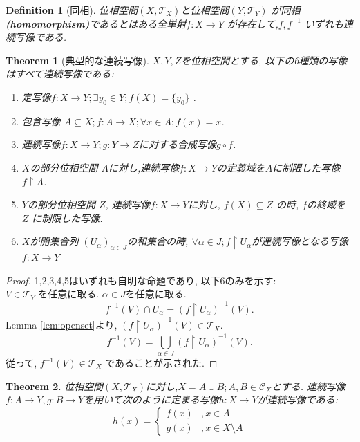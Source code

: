 \documentclass[dvipdfmx]{jbook}
\newtheorem{theorem}{Theorem}[section]
\newtheorem{definition}{Definition}[section]
\theoremstyle{remark}
\theoremstyle{plain}
\begin{document}
\begin{definition}[同相]
	位相空間$\left( X,\mathcal{T}_X \right) $と位相空間$\left( Y,\mathcal{T}_Y \right) $ が同相\textbf{(homomorphism)}であるとはある全単射$f:X\to Y$ が存在して,$f,f^{-1}$ いずれも連続写像である.  
\end{definition}










\begin{theorem}[典型的な連続写像]
	$X,Y,Z$を位相空間とする, 以下の6種類の写像はすべて連続写像である:
	 \begin{enumerate}
		\item 定写像$f: X \to Y; \exists y_0 \in Y ; f(X) =\{y_0\} $ .
		\item 包含写像 $A\subseteq X ; f: A \to X; \forall x \in A; f(x)=x$.
		\item 連続写像$f:X\to Y; g:Y\to Z$に対する合成写像$g\circ f$.
		\item $X$の部分位相空間 $A$に対し,連続写像$f:X\to Y$の定義域を$A$に制限した写像 $f\upharpoonright A$.
		\item  $Y$の部分位相空間 $Z$, 連続写像$f:X \to Y$に対し, $f\left( X \right) \subseteq Z$ の時, $f$の終域を $Z$ に制限した写像.
		\item $X$が開集合列 $\left(U_{\alpha}\right) _{\alpha \in J}$の和集合の時,  $\forall \alpha \in J; f\upharpoonright U_{\alpha}$が連続写像となる写像 $f:X \to Y$
	\end{enumerate}
\end{theorem}

\begin{proof}
	1,2,3,4,5はいずれも自明な命題であり, 以下6のみを示す:\\
	$V \in \mathcal{T}_Y$ を任意に取る. $\alpha \in J$を任意に取る.
	\[
	f^{-1}(V)\cap U_{\alpha} = (f\upharpoonright U_{\alpha})^{-1}(V)
	.\] 
	Lemma \ref{lem:openset}より, $ (f\upharpoonright U_{\alpha})^{-1}(V) \in \mathcal{T}_X$.
	\[
	f^{-1}(V)=\bigcup_{\alpha \in J}  (f\upharpoonright U_{\alpha})^{-1}(V)
	.\]
	従って, $f^{-1}(V) \in \mathcal{T}_X$ であることが示された.
\end{proof}

\begin{theorem}
\label{thm:paste}
	位相空間$(X,\mathcal{T}_X)$に対し,$X=A \cup B; A,B \in \mathcal{C}_X$とする. 連続写像$f:A\to Y,g:B\to Y$を用いて次のように定まる写像$h :X\to Y $が連続写像である:
	\[
	h\left( x\right) =
	\begin{cases}
		f(x) &,x \in A\\
		g(x) &,x \in X\setminus A
	\end{cases}
	\] 
\end{theorem}
\end{document}
